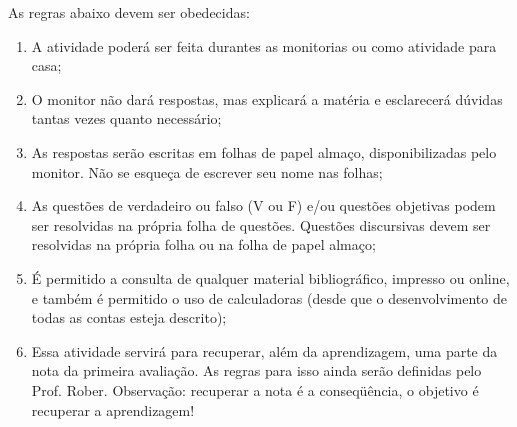 \documentclass[pdftex, brazil, 12pt, oneside, addpoints]{exam}
\begin{document}
As regras abaixo devem ser obedecidas:

\begin{enumerate}
  \item A atividade poderá ser feita durantes as monitorias ou
        como atividade para casa;
  \item O monitor não dará respostas, mas explicará a matéria e
        esclarecerá dúvidas tantas vezes quanto necessário;
  \item As respostas serão escritas em folhas de papel almaço,
        disponibilizadas pelo monitor. Não se esqueça de escrever seu
        nome nas folhas;
  \item As questões de verdadeiro ou falso (V ou F) e/ou questões
        objetivas podem ser resolvidas na própria folha de
        questões. Questões discursivas devem ser resolvidas na própria
        folha ou na folha de papel almaço;
  \item É permitido a consulta de qualquer material bibliográfico,
        impresso ou online, e também é permitido o uso de calculadoras
        (desde que o desenvolvimento de todas as contas esteja
        descrito);
  \item Essa atividade servirá para recuperar, além da aprendizagem,
        uma parte da nota da primeira avaliação. As regras para isso
        ainda serão definidas pelo Prof. Rober. Observação: recuperar
        a nota é a conseqüência, o objetivo é recuperar a aprendizagem!
\end{enumerate}
\end{document}
